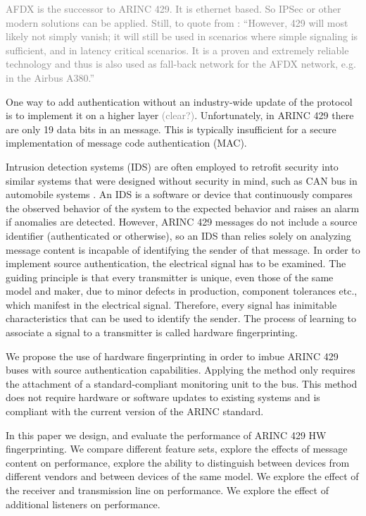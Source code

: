 \documentclass[conference]{IEEEtran}
\begin{document}
  \textcolor{gray}{AFDX is the successor to ARINC 429. It is ethernet based. So IPSec or other modern solutions can be applied. Still, to quote from \cite{fuchs2012evolution}: ``However, 429 will most likely not simply vanish; it will still be used in scenarios where simple signaling is sufficient, and in latency critical scenarios. It is a proven and extremely reliable technology and thus is also used as fall-back network for the AFDX network, e.g. in the Airbus A380.''}
  
  One way to add authentication without an industry-wide update of the protocol is to implement it on a higher layer \textcolor{gray}{(clear?)}. Unfortunately, in ARINC 429 there are only 19 data bits in an message. This is typically insufficient for a secure implementation of message code authentication (MAC).
  
  Intrusion detection systems (IDS) are often employed to retrofit security into similar systems that were designed without security in mind, such as CAN bus in automobile systems \cite{}. An IDS is a software or device that continuously compares the observed behavior of the system to the expected behavior and raises an alarm if anomalies are detected. However, ARINC 429 messages do not include a source identifier (authenticated or otherwise), so an IDS than relies solely on analyzing message content is incapable of identifying the sender of that message. In order to implement source authentication, the electrical signal has to be examined. The guiding principle is that every transmitter is unique, even those of the same model and maker, due to minor defects in production, component tolerances etc., which manifest in the electrical signal. Therefore, every signal has inimitable characteristics that can be used to identify the sender. The process of learning to associate a signal to a transmitter is called hardware fingerprinting.
  
  We propose the use of hardware fingerprinting in order to imbue ARINC 429 buses with source authentication capabilities. Applying the method only requires the attachment of a standard-compliant monitoring unit to the bus. This method does not require hardware or software updates to existing systems and is compliant with the current version of the ARINC standard.
  
  In this paper we design, and evaluate the performance of ARINC 429 HW fingerprinting. We compare different feature sets, explore the effects of message content on performance, explore the ability to distinguish between devices from different vendors and between devices of the same model. We explore the effect of the receiver and transmission line on performance. We explore the effect of additional listeners on performance.
  
\end{document}
